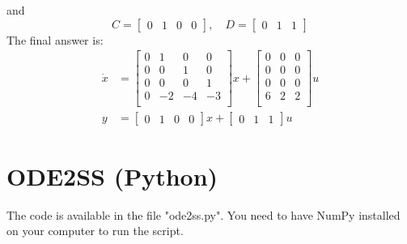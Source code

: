 \documentclass{article}
\begin{document}
    and 
    \begin{equation}
        C = 
        \begin{bmatrix}
            0 & 1 & 0 & 0
        \end{bmatrix}, \quad
        D = 
        \begin{bmatrix}
            0 & 1 & 1
        \end{bmatrix}
    \end{equation}
    The final answer is:
    \begin{align}
        \dot{x} &=
        \begin{bmatrix}
            0 & 1 & 0 & 0\\
            0 & 0 & 1 & 0\\
            0 & 0 & 0 & 1\\
            0 & -2 & -4 & -3\\
        \end{bmatrix}
        x + 
        \begin{bmatrix}
            0 & 0 & 0\\
            0 & 0 & 0\\
            0 & 0 & 0\\
            6 & 2 & 2\\
        \end{bmatrix}
        u\\
        y &= 
        \begin{bmatrix}
            0 & 1 & 0 & 0
        \end{bmatrix}
        x + 
        \begin{bmatrix}
            0 & 1 & 1
        \end{bmatrix}
        u
    \end{align}
    
\section{ODE2SS (Python)}
    The code is available in the file "ode2ss.py".
    You need to have NumPy installed on your computer to run the script.
    
\end{document}
